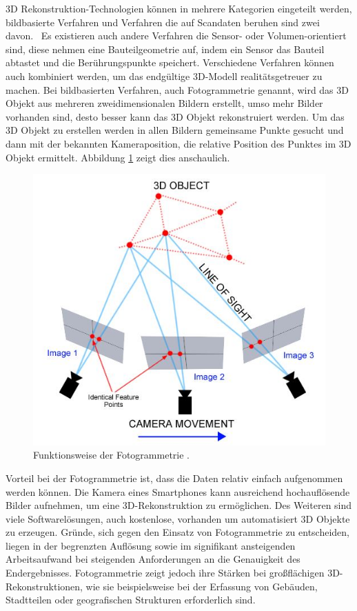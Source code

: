 3D Rekonstruktion-Technologien können in mehrere Kategorien eingeteilt werden,
bildbasierte Verfahren und  Verfahren die auf Scandaten 
beruhen sind zwei davon.~\cite{Verykokou.2023}
Es existieren auch andere Verfahren die Sensor- oder Volumen-orientiert sind, 
diese nehmen eine Bauteilgeometrie auf, indem ein Sensor das Bauteil abtastet 
und die Berührungspunkte speichert.
Verschiedene Verfahren können auch kombiniert werden, um das endgültige 3D-Modell
realitätsgetreuer zu machen.
Bei bildbasierten Verfahren, auch Fotogrammetrie genannt, wird das 3D Objekt aus
mehreren zweidimensionalen Bildern erstellt, 
umso mehr Bilder vorhanden sind, desto besser kann das
3D Objekt rekonstruiert werden. Um das 3D Objekt zu erstellen werden in 
allen Bildern gemeinsame Punkte gesucht und dann mit der bekannten Kameraposition, 
die relative Position des Punktes im 3D Objekt ermittelt.\cite{schenk2005introduction}
Abbildung \ref{fig:photogammatry} zeigt dies anschaulich.

\begin{figure}[H]
    \centering
    \includegraphics[width=0.7\linewidth]{images/photogrammetry.jpg}
    \caption{Funktionsweise der Fotogrammetrie \cite{.13.08.2024}.}
    \label{fig:photogammatry}
\end{figure}

Vorteil bei der Fotogrammetrie ist, dass die Daten relativ einfach aufgenommen werden
können. Die Kamera eines Smartphones kann ausreichend hochauflösende Bilder aufnehmen, um 
eine 3D-Rekonstruktion zu ermöglichen. Des Weiteren sind viele Softwarelösungen,
auch kostenlose, vorhanden um automatisiert 3D Objekte zu erzeugen.
Gründe, sich gegen den Einsatz von Fotogrammetrie zu entscheiden, 
liegen in der begrenzten Auflösung sowie im signifikant ansteigenden Arbeitsaufwand 
bei steigenden Anforderungen an die Genauigkeit des Endergebnisses. 
Fotogrammetrie zeigt jedoch ihre Stärken bei großflächigen 3D-Rekonstruktionen, 
wie sie beispielsweise bei der Erfassung von Gebäuden, Stadtteilen oder geografischen 
Strukturen erforderlich sind.


